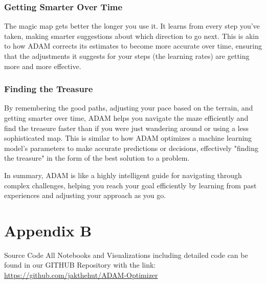 \documentclass[journal]{IEEEtran}
\begin{document}
\subsubsection*{Getting Smarter Over Time}
The magic map gets better the longer you use it. It learns from every step you've taken, making smarter suggestions about which direction to go next. This is akin to how ADAM corrects its estimates to become more accurate over time, ensuring that the adjustments it suggests for your steps (the learning rates) are getting more and more effective.  
   
\subsubsection*{Finding the Treasure}
By remembering the good paths, adjusting your pace based on the terrain, and getting smarter over time, ADAM helps you navigate the maze efficiently and find the treasure faster than if you were just wandering around or using a less sophisticated map. This is similar to how ADAM optimizes a machine learning model's parameters to make accurate predictions or decisions, effectively "finding the treasure" in the form of the best solution to a problem. 
  
In summary, ADAM is like a highly intelligent guide for navigating through complex challenges, helping you reach your goal efficiently by learning from past experiences and adjusting your approach as you go.

\section{Appendix B}
\centering Source Code
All Notebooks and Visualizations including detailed code can be found in our GITHUB Repository with the link: \href{https://github.com/jakthehut/ADAM-Optimizer}{https://github.com/jakthehut/ADAM-Optimizer}
\end{document}

